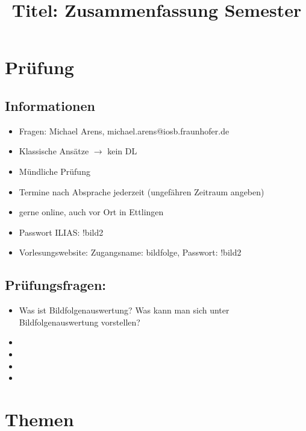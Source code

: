 \documentclass{report}
\title{Titel: Zusammenfassung Semester}
\begin{document}
	
	\maketitle
	\newpage
	
	\tableofcontents
	\newpage
	
	\chapter{Prüfung}
	
	\section{Informationen}
	
	\begin{itemize}
		\item Fragen: Michael Arens, michael.arens@iosb.fraunhofer.de
		\item Klassische Ansätze $\rightarrow$ kein DL
		\item Mündliche Prüfung
		\item Termine nach Absprache jederzeit (ungefähren Zeitraum angeben)
		\item gerne online, auch vor Ort in Ettlingen
		
		\item Passwort ILIAS: !bild2
		\item Vorlesungswebsite:
		\newline Zugangsname: bildfolge,
		\newline Passwort: !bild2
	\end{itemize}
	\newpage

	\section{Prüfungsfragen:}
	
	\begin{itemize}
		\item Was ist Bildfolgenauswertung? Was kann man sich unter Bildfolgenauswertung vorstellen?
		\item 
		\item 
		\item 
		\item 
	\end{itemize}
	
	\chapter{Themen}
	
\end{document}
